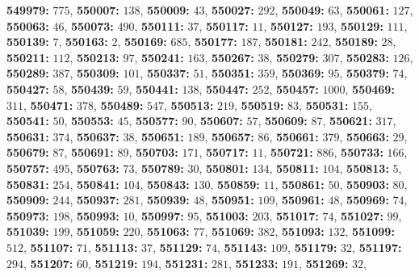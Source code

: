\textsf{\bfseries 549979:} $775$, \textsf{\bfseries 550007:} $138$, \textsf{\bfseries 550009:} $43$, \textsf{\bfseries 550027:} $292$, \textsf{\bfseries 550049:} $63$, \textsf{\bfseries 550061:} $127$, \textsf{\bfseries 550063:} $46$, \textsf{\bfseries 550073:} $490$, \textsf{\bfseries 550111:} $37$, \textsf{\bfseries 550117:} $11$, \textsf{\bfseries 550127:} $193$, \textsf{\bfseries 550129:} $111$, \textsf{\bfseries 550139:} $7$, \textsf{\bfseries 550163:} $2$, \textsf{\bfseries 550169:} $685$, \textsf{\bfseries 550177:} $187$, \textsf{\bfseries 550181:} $242$, \textsf{\bfseries 550189:} $28$, \textsf{\bfseries 550211:} $112$, \textsf{\bfseries 550213:} $97$, \textsf{\bfseries 550241:} $163$, \textsf{\bfseries 550267:} $38$, \textsf{\bfseries 550279:} $307$, \textsf{\bfseries 550283:} $126$, \textsf{\bfseries 550289:} $387$, \textsf{\bfseries 550309:} $101$, \textsf{\bfseries 550337:} $51$, \textsf{\bfseries 550351:} $359$, \textsf{\bfseries 550369:} $95$, \textsf{\bfseries 550379:} $74$, \textsf{\bfseries 550427:} $58$, \textsf{\bfseries 550439:} $59$, \textsf{\bfseries 550441:} $138$, \textsf{\bfseries 550447:} $252$, \textsf{\bfseries 550457:} $1000$, \textsf{\bfseries 550469:} $311$, \textsf{\bfseries 550471:} $378$, \textsf{\bfseries 550489:} $547$, \textsf{\bfseries 550513:} $219$, \textsf{\bfseries 550519:} $83$, \textsf{\bfseries 550531:} $155$, \textsf{\bfseries 550541:} $50$, \textsf{\bfseries 550553:} $45$, \textsf{\bfseries 550577:} $90$, \textsf{\bfseries 550607:} $57$, \textsf{\bfseries 550609:} $87$, \textsf{\bfseries 550621:} $317$, \textsf{\bfseries 550631:} $374$, \textsf{\bfseries 550637:} $38$, \textsf{\bfseries 550651:} $189$, \textsf{\bfseries 550657:} $86$, \textsf{\bfseries 550661:} $379$, \textsf{\bfseries 550663:} $29$, \textsf{\bfseries 550679:} $87$, \textsf{\bfseries 550691:} $89$, \textsf{\bfseries 550703:} $171$, \textsf{\bfseries 550717:} $11$, \textsf{\bfseries 550721:} $886$, \textsf{\bfseries 550733:} $166$, \textsf{\bfseries 550757:} $495$, \textsf{\bfseries 550763:} $73$, \textsf{\bfseries 550789:} $30$, \textsf{\bfseries 550801:} $134$, \textsf{\bfseries 550811:} $104$, \textsf{\bfseries 550813:} $5$, \textsf{\bfseries 550831:} $254$, \textsf{\bfseries 550841:} $104$, \textsf{\bfseries 550843:} $130$, \textsf{\bfseries 550859:} $11$, \textsf{\bfseries 550861:} $50$, \textsf{\bfseries 550903:} $80$, \textsf{\bfseries 550909:} $244$, \textsf{\bfseries 550937:} $281$, \textsf{\bfseries 550939:} $48$, \textsf{\bfseries 550951:} $109$, \textsf{\bfseries 550961:} $48$, \textsf{\bfseries 550969:} $74$, \textsf{\bfseries 550973:} $198$, \textsf{\bfseries 550993:} $10$, \textsf{\bfseries 550997:} $95$, \textsf{\bfseries 551003:} $203$, \textsf{\bfseries 551017:} $74$, \textsf{\bfseries 551027:} $99$, \textsf{\bfseries 551039:} $199$, \textsf{\bfseries 551059:} $220$, \textsf{\bfseries 551063:} $77$, \textsf{\bfseries 551069:} $382$, \textsf{\bfseries 551093:} $132$, \textsf{\bfseries 551099:} $512$, \textsf{\bfseries 551107:} $71$, \textsf{\bfseries 551113:} $37$, \textsf{\bfseries 551129:} $74$, \textsf{\bfseries 551143:} $109$, \textsf{\bfseries 551179:} $32$, \textsf{\bfseries 551197:} $294$, \textsf{\bfseries 551207:} $60$, \textsf{\bfseries 551219:} $194$, \textsf{\bfseries 551231:} $281$, \textsf{\bfseries 551233:} $191$, \textsf{\bfseries 551269:} $32$, 
